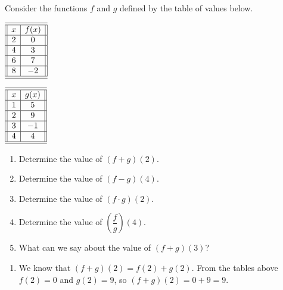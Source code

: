 \documentclass{ximera}
\begin{document}
	\begin{example}
		Consider the functions $f$ and $g$ defined by the table of values below. \\
		\begin{minipage}{.5\textwidth}
		  	\begin{center}
				$\begin{array}{||c|c||}
					\hline 
					\hline
					x & f(x)\\
					\hline
					2&0\\
					\hline
					4&3\\
					\hline
					6&7\\
					\hline
					8& -2\\
					\hline 
					\hline
				\end{array}$
			\end{center}
		\end{minipage}%
		\begin{minipage}{.5\textwidth}
		  	\begin{center}
				$\begin{array}{||c|c||}
					\hline 
					\hline
					x & g(x)\\
					\hline
					1&5\\
					\hline
					2&9\\
					\hline
					3&-1\\
					\hline
					4& 4\\
					\hline 
					\hline
				\end{array}$
			\end{center}
		\end{minipage}
		\begin{enumerate}
			\item Determine the value of $(f+g)(2)$.\\
			\item Determine the value of $(f-g)(4)$.\\
			\item Determine the value of $(f \cdot g)(2)$.\\
			\item Determine the value of  $\left( \dfrac{f}{g} \right)(4)$.\\
			\item What can we say about the value of $(f+g)(3)$?\\
		\end{enumerate}
		\begin{explanation}
			\begin{enumerate}
				\item We know that $(f+g)(2) = f(2)+g(2)$. From the tables above $f(2) = 0$ and $g(2)=9$, so $(f+g)(2)=0+9 = 9$.
				

\end{enumerate}
\end{explanation}
\end{example}
\end{document}

